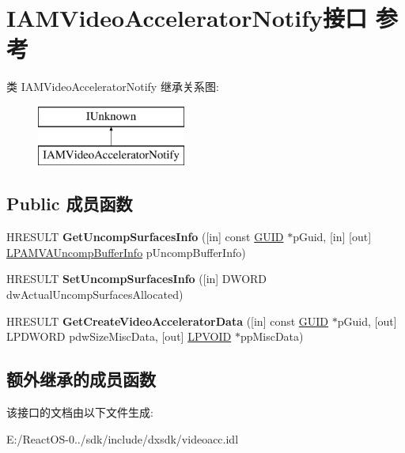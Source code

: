 \hypertarget{interface_i_a_m_video_accelerator_notify}{}\section{I\+A\+M\+Video\+Accelerator\+Notify接口 参考}
\label{interface_i_a_m_video_accelerator_notify}
类 I\+A\+M\+Video\+Accelerator\+Notify 继承关系图\+:\begin{figure}[H]
\begin{center}
\leavevmode
\includegraphics[height=2.000000cm]{interface_i_a_m_video_accelerator_notify}
\end{center}
\end{figure}
\subsection*{Public 成员函数}
\begin{DoxyCompactItemize}
\item 
\mbox{\label{interface_i_a_m_video_accelerator_notify_a4c9cf1c8e6cd93e37006b129b384a69d}} 
H\+R\+E\+S\+U\+LT {\bfseries Get\+Uncomp\+Surfaces\+Info} (\mbox{[}in\mbox{]} const \hyperlink{interface_g_u_i_d}{G\+U\+ID} $\ast$p\+Guid, \mbox{[}in\mbox{]} \mbox{[}out\mbox{]} \hyperlink{struct__tag___a_m_v_a_uncomp_buffer_info}{L\+P\+A\+M\+V\+A\+Uncomp\+Buffer\+Info} p\+Uncomp\+Buffer\+Info)
\item 
\mbox{\label{interface_i_a_m_video_accelerator_notify_a588602debd5a2b7132cf941a34cc2469}} 
H\+R\+E\+S\+U\+LT {\bfseries Set\+Uncomp\+Surfaces\+Info} (\mbox{[}in\mbox{]} D\+W\+O\+RD dw\+Actual\+Uncomp\+Surfaces\+Allocated)
\item 
\mbox{\label{interface_i_a_m_video_accelerator_notify_a80b2aea41a1f5a3d61aedf7980b3a22e}} 
H\+R\+E\+S\+U\+LT {\bfseries Get\+Create\+Video\+Accelerator\+Data} (\mbox{[}in\mbox{]} const \hyperlink{interface_g_u_i_d}{G\+U\+ID} $\ast$p\+Guid, \mbox{[}out\mbox{]} L\+P\+D\+W\+O\+RD pdw\+Size\+Misc\+Data, \mbox{[}out\mbox{]} \hyperlink{interfacevoid}{L\+P\+V\+O\+ID} $\ast$pp\+Misc\+Data)
\end{DoxyCompactItemize}
\subsection*{额外继承的成员函数}


该接口的文档由以下文件生成\+:\begin{DoxyCompactItemize}
\item 
E\+:/\+React\+O\+S-\/0../sdk/include/dxsdk/videoacc.\+idl\end{DoxyCompactItemize}

